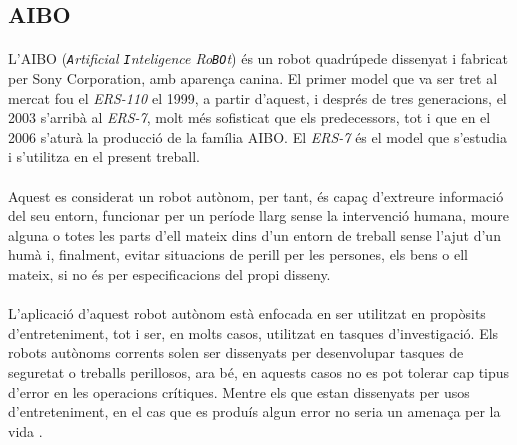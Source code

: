 \documentclass[12pt,a4paper,final,twoside]{article}
\begin{document}
\label{AIBO}
\subsection{AIBO}
\paragraph{}L'AIBO (\textit{\texttt{A}rtificial \texttt{I}nteligence Ro\texttt{BO}t}) és un robot quadrúpede dissenyat i fabricat per Sony Corporation, amb aparença canina. El primer model que va ser tret al mercat fou el \textit{ERS-110} el 1999, a partir d'aquest, i després de tres generacions, el 2003 s'arribà al \textit{ERS-7}, molt més sofisticat que els predecessors, tot i que en el 2006 s'aturà la producció de la família AIBO. El \textit{ERS-7} és el model que s'estudia i s'utilitza en el present treball.

\paragraph{}Aquest es considerat un robot autònom, per tant, és capaç d'extreure informació del seu entorn, funcionar per un període llarg sense la intervenció humana, moure alguna o totes les parts d'ell mateix dins d'un entorn de treball sense l'ajut d'un humà i, finalment, evitar situacions de perill per les persones, els bens o ell mateix, si no és per especificacions del propi disseny.

\paragraph{}L'aplicació d'aquest robot autònom està enfocada en ser utilitzat en propòsits d'entreteniment, tot i ser, en molts casos, utilitzat en tasques d'investigació. Els robots autònoms corrents solen ser dissenyats per desenvolupar tasques de seguretat o treballs perillosos, ara bé, en aquests casos no es pot tolerar cap tipus d'error en les operacions crítiques. Mentre els que estan dissenyats per usos d'entreteniment, en el cas que es produís algun error no seria un amenaça per la vida \cite{Fujita2000}.
\end{document}
